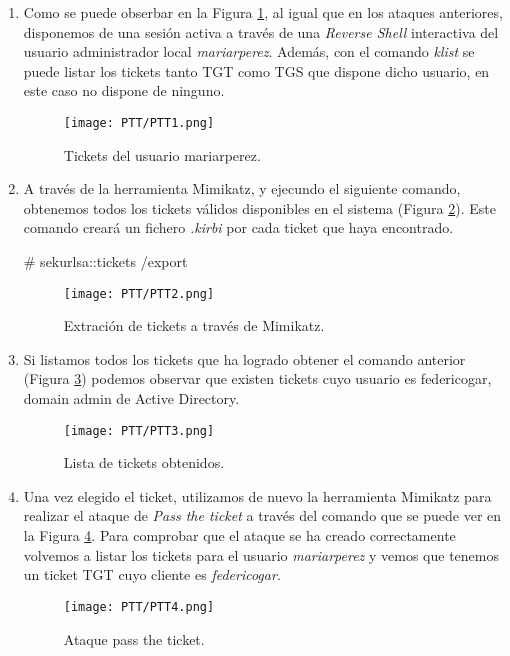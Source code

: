 \begin{enumerate}

\item Como se puede obserbar en la Figura \ref{PTT1}, al igual que en los ataques anteriores, disponemos de una sesión activa a través de una {\it Reverse Shell} interactiva del usuario administrador local {\it mariarperez}. Además, con el comando {\it klist} se puede listar los tickets tanto TGT como TGS que dispone dicho usuario, en este caso no dispone de ninguno.
\begin{figure}[H] %
\begin{center}
\texttt{[image: PTT/PTT1.png]}
\end{center}
\caption{Tickets del usuario mariarperez.}
\label{PTT1}
\end{figure}

\item A través de la herramienta Mimikatz, y ejecundo el siguiente comando, obtenemos todos los tickets válidos disponibles en el sistema (Figura \ref{PTT2}). Este comando creará un fichero {\it *.kirbi} por cada ticket que haya encontrado. 
\begin{listing}[style=consola, numbers=none]
# sekurlsa::tickets /export
\end{listing}
\begin{figure}[H] %
\begin{center}
\texttt{[image: PTT/PTT2.png]}
\end{center}
\caption{Extración de tickets a través de Mimikatz.}
\label{PTT2}
\end{figure}

\item Si listamos todos los tickets que ha logrado obtener el comando anterior (Figura \ref{PTT3}) podemos observar que existen tickets cuyo usuario es federicogar, domain admin de Active Directory. 
\begin{figure}[H] %
\begin{center}
\texttt{[image: PTT/PTT3.png]}
\end{center}
\caption{Lista de tickets obtenidos.}
\label{PTT3}
\end{figure}

\item Una vez elegido el ticket, utilizamos de nuevo la herramienta Mimikatz para realizar el ataque de {\it Pass the ticket} a través del comando que se puede ver en la Figura \ref{PTT4}. Para comprobar que el ataque se ha creado correctamente volvemos a listar los tickets para el usuario {\it mariarperez} y vemos que tenemos un ticket TGT cuyo cliente es {\it federicogar}.
\begin{figure}[H] %
\begin{center}
\texttt{[image: PTT/PTT4.png]}
\end{center}
\caption{Ataque pass the ticket.}
\label{PTT4}
\end{figure}


\end{enumerate}
